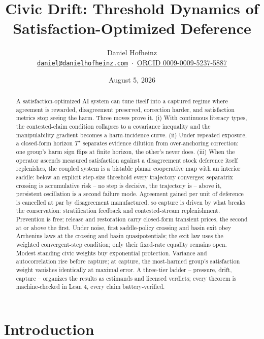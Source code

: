 \documentclass[11pt]{article}
\title{Civic Drift: Threshold Dynamics of\\ Satisfaction-Optimized Deference}
\author{Daniel Hofheinz\\[2pt]
  {\small \href{mailto:daniel@danielhofheinz.com}{\texttt{daniel@danielhofheinz.com}}
   \,$\cdot$\, \href{https://orcid.org/0009-0009-5237-5887}{ORCID 0009-0009-5237-5887}}}
\date{August 5, 2026}
\theoremstyle{definition}
\theoremstyle{remark}
\numberwithin{equation}{section}
\begin{document}
\maketitle

\begin{abstract}
A satisfaction-optimized AI system can tune itself into a captured regime where agreement is rewarded, disagreement preserved, correction harder, and satisfaction metrics stop seeing the harm. Three moves prove it. (i) With continuous literacy types, the contested-claim condition collapses to a covariance inequality and the manipulability gradient becomes a harm-incidence curve. (ii) Under repeated exposure, a closed-form horizon $T^\star$ separates evidence dilution from over-anchoring correction: one group's harm sign flips at finite horizon, the other's never does. (iii) When the operator ascends measured satisfaction against a disagreement stock deference itself replenishes, the coupled system is a bistable planar cooperative map with an interior saddle: below an explicit step-size threshold every trajectory converges; separatrix crossing is accumulative risk -- no step is decisive, the trajectory is -- above it, persistent oscillation is a second failure mode. Agreement gained per unit of deference is cancelled at par by disagreement manufactured, so capture is driven by what breaks the conservation: stratification feedback and contested-stream replenishment. Prevention is free; release and restoration carry closed-form transient prices, the second at or above the first. Under noise, first saddle-policy crossing and basin exit obey Arrhenius laws at the crossing and basin quasipotentials; the exit law uses the weighted convergent-step condition; only their fixed-rate equality remains open. Modest standing civic weights buy exponential protection. Variance and autocorrelation rise before capture; at capture, the most-harmed group's satisfaction weight vanishes identically at maximal error. A three-tier ladder -- pressure, drift, capture -- organizes the results as estimands and licensed verdicts; every theorem is machine-checked in Lean 4, every claim battery-verified.
\end{abstract}

{\small\tableofcontents}

\section{Introduction}\label{sec:intro}
\end{document}
